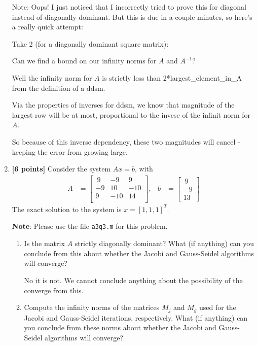 \documentclass{article}
\begin{document}
\begin{enumerate}
\begin{mdframed}[style=MyFrame]
Note: Oops! I just noticed that I incorrectly tried to prove this for diagonal instead of diagonally-dominant. But this is due in a couple minutes, so here's a really quick attempt:

Take 2 (for a diagonally dominant square matrix):

Can we find a bound on our infinity norms for $A$ and $A^{-1}$?

Well the infinity norm for $A$ is strictly less than 2*largest\_element\_in\_A from the definition of a ddsm.

Via the properties of inverses for ddsm, we know that magnitude of the largest row will be at most, proportional to the invese of the infinit norm for $A$.

So because of this inverse dependency, these two magnitudes will cancel - keeping the error from growing large.

\end{mdframed}

\item {\bf[6 points]} Consider the system $Ax = b$, with
\begin{align*}
A &= \begin{bmatrix}
 ~9     &-9     &9 \\
  -9     &10     &-10 \\
   9     &-10     &14 \\
\end{bmatrix},
&b &= \begin{bmatrix}~9 \\-9\\13 \end{bmatrix}
\end{align*}
The exact solution to the system is $x = [1, 1, 1]^T$.

{\bf Note}: Please use the file {\tt a3q3.m} for this problem.

\begin{enumerate}
\item Is the matrix $A$ strictly diagonally dominant? What (if anything) can you conclude from this about whether the Jacobi and Gauss-Seidel algorithms will converge? \newline

\begin{mdframed}[style=MyFrame]
No it is not. We cannot conclude anything about the possibility of the converge from this.
\end{mdframed}

\item Compute the infinity norms of the matrices $M_j$ and $M_g$ used for the Jacobi and Gauss-Seidel iterations, respectively. What (if anything) can you conclude from these norms about whether the Jacobi and Gauss-Seidel algorithms will converge?


\end{enumerate}
\end{enumerate}
\end{document}
